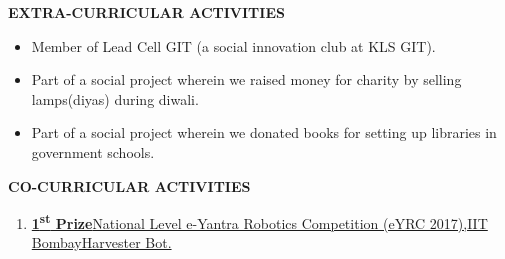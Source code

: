 \documentclass[a4paper]{article}
\begin{document}
	\begin{flushleft}
		\vspace{5mm}
		\large{\textbf{EXTRA-CURRICULAR ACTIVITIES }} 
		\vspace{0.5mm}
		\noindent\hrulefill
		\vspace{0.5mm}
	\end{flushleft}
	\begin{itemize}
		\item Member of Lead Cell GIT (a social innovation club at KLS GIT). 
		\item Part of a social project wherein we raised money for charity by selling lamps(diyas) during diwali. 
		\item Part of a social project wherein we donated books for setting up libraries in government schools.           
	\end{itemize}

	\begin{flushleft}
		\vspace{5mm}
		\large{\textbf{CO-CURRICULAR ACTIVITIES}} 
		\vspace{0.5mm}
		\noindent\hrulefill
		\vspace{0.5mm}
	\end{flushleft}
	\begin{enumerate}
		\item \href{http://eycgen.e-yantra.org/index.php/validate/1c554533d0991a7d96b51b2238d1d3df75ebc0b0}{\textbf{1\textsuperscript{st} Prize}\textbar National Level e-Yantra Robotics Competition (eYRC 2017),IIT Bombay\textbar Harvester Bot.}       
	\end{enumerate}
\end{document}

